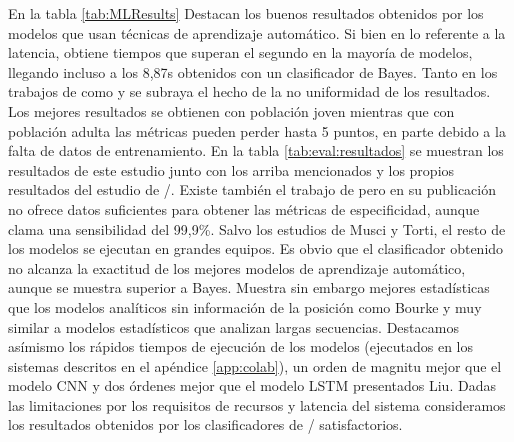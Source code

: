 En la tabla \ref{tab:MLResults} Destacan los buenos resultados obtenidos por los modelos que usan técnicas de aprendizaje automático. Si bien en lo referente a la latencia, \cite{Liu2020} obtiene tiempos que superan el segundo en la mayoría de modelos, llegando incluso a los 8,87s obtenidos con un clasificador de Bayes. Tanto en los trabajos de \cite{Liu2018, Liu2020} como \cite{Musci2020} y \cite{Torti2018} se subraya el hecho de la no uniformidad de los resultados. Los mejores resultados se obtienen con población joven mientras que con población adulta las métricas pueden perder hasta 5 puntos, en parte debido a la falta de datos de entrenamiento. En la tabla \ref{tab:eval:resultados} se muestran los resultados de este estudio junto con los arriba mencionados y los propios resultados del estudio de \sisfall/\cite{Sucerquia2017}. Existe también el trabajo de  pero en su publicación no ofrece datos suficientes para obtener las métricas de especificidad, aunque clama una sensibilidad del 99,9\%. Salvo los estudios de Musci y Torti, el resto de los modelos se ejecutan en grandes equipos. Es obvio que el clasificador obtenido no alcanza la exactitud de los mejores modelos de aprendizaje automático, aunque se muestra superior a Bayes. Muestra sin embargo mejores estadísticas que los modelos analíticos sin información de la posición como Bourke y muy similar a modelos estadísticos que analizan largas secuencias. Destacamos asímismo los rápidos tiempos de ejecución de los modelos (ejecutados en los sistemas descritos en el apéndice \ref{app:colab}), un orden de magnitu mejor que el modelo CNN y dos órdenes mejor que el modelo LSTM presentados Liu. Dadas las limitaciones por los requisitos de recursos y latencia del sistema consideramos los resultados obtenidos por los clasificadores de \ifell/ satisfactorios.


